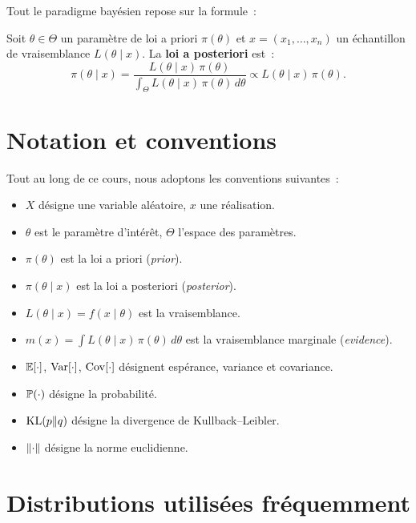 Tout le paradigme bay\'esien repose sur la formule~:

\begin{formules}[title=\textbf{Th\'eor\`eme de Bayes}]
Soit $\theta \in \Theta$ un param\`etre de loi a priori $\pi(\theta)$
et $x = (x_1, \ldots, x_n)$ un \'echantillon de vraisemblance
$L(\theta \mid x)$. La \textbf{loi a posteriori} est~:
\[
  \pi(\theta \mid x)
  = \frac{L(\theta \mid x)\,\pi(\theta)}
         {\int_{\Theta} L(\theta \mid x)\,\pi(\theta)\,d\theta}
  \propto L(\theta \mid x)\,\pi(\theta).
\]
\end{formules}

\section*{Notation et conventions}

Tout au long de ce cours, nous adoptons les conventions suivantes~:

\begin{itemize}
  \item $X$ d\'esigne une variable al\'eatoire, $x$ une r\'ealisation.
  \item $\theta$ est le param\`etre d'int\'er\^et, $\Theta$ l'espace
        des param\`etres.
  \item $\pi(\theta)$ est la loi a priori (\textit{prior}).
  \item $\pi(\theta \mid x)$ est la loi a posteriori (\textit{posterior}).
  \item $L(\theta \mid x) = f(x \mid \theta)$ est la vraisemblance.
  \item $m(x) = \int L(\theta \mid x)\,\pi(\theta)\,d\theta$ est la
        vraisemblance marginale (\textit{evidence}).
  \item $\mathbb{E}[\cdot]$, $\mathrm{Var}[\cdot]$, $\mathrm{Cov}[\cdot]$ d\'esignent
        esp\'erance, variance et covariance.
  \item $\mathbb{P}(\cdot)$ d\'esigne la probabilit\'e.
  \item $\mathrm{KL}(p \| q)$ d\'esigne la divergence de Kullback--Leibler.
  \item $\left\| \cdot \right\|$ d\'esigne la norme euclidienne.
\end{itemize}

\section*{Distributions utilis\'ees fr\'equemment}

